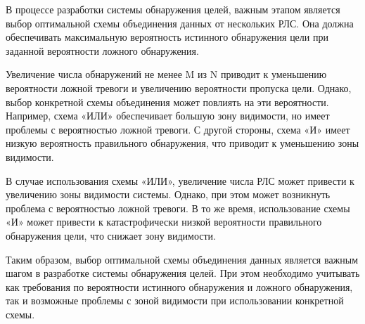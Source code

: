 \Conclusion %

В процессе разработки системы обнаружения целей, важным этапом является выбор оптимальной схемы объединения данных от нескольких РЛС. Она должна обеспечивать максимальную вероятность истинного обнаружения цели при заданной вероятности ложного обнаружения. 

Увеличение числа обнаружений не менее M из N приводит к уменьшению вероятности ложной тревоги и увеличению вероятности пропуска цели. Однако, выбор конкретной схемы объединения может повлиять на эти вероятности. Например, схема «ИЛИ» обеспечивает большую зону видимости, но имеет проблемы с вероятностью ложной тревоги. С другой стороны, схема «И» имеет низкую вероятность правильного обнаружения, что приводит к уменьшению зоны видимости.

В случае использования схемы «ИЛИ», увеличение числа РЛС может привести к увеличению зоны видимости системы. Однако, при этом может возникнуть проблема с вероятностью ложной тревоги. В то же время, использование схемы «И» может привести к катастрофически низкой вероятности правильного обнаружения цели, что снижает зону видимости. 

Таким образом, выбор оптимальной схемы объединения данных является важным шагом в разработке системы обнаружения целей. При этом необходимо учитывать как требования по вероятности истинного обнаружения и ложного обнаружения, так и возможные проблемы с зоной видимости при использовании конкретной схемы.